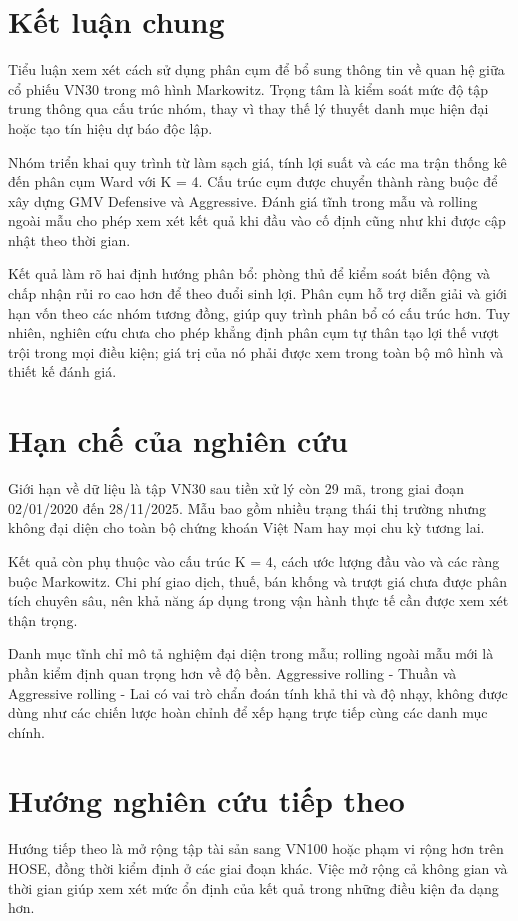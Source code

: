 \documentclass[12pt,a4paper,openany,oneside]{book}
\begin{document}
\section{Kết luận chung}\label{Toc227188454}
Tiểu luận xem xét cách sử dụng phân cụm để bổ sung thông tin về quan hệ giữa cổ phiếu VN30 trong mô hình Markowitz. Trọng tâm là kiểm soát mức độ tập trung thông qua cấu trúc nhóm, thay vì thay thế lý thuyết danh mục hiện đại hoặc tạo tín hiệu dự báo độc lập.

Nhóm triển khai quy trình từ làm sạch giá, tính lợi suất và các ma trận thống kê đến phân cụm Ward với K = 4. Cấu trúc cụm được chuyển thành ràng buộc để xây dựng GMV Defensive và Aggressive. Đánh giá tĩnh trong mẫu và rolling ngoài mẫu cho phép xem xét kết quả khi đầu vào cố định cũng như khi được cập nhật theo thời gian.

Kết quả làm rõ hai định hướng phân bổ: phòng thủ để kiểm soát biến động và chấp nhận rủi ro cao hơn để theo đuổi sinh lợi. Phân cụm hỗ trợ diễn giải và giới hạn vốn theo các nhóm tương đồng, giúp quy trình phân bổ có cấu trúc hơn. Tuy nhiên, nghiên cứu chưa cho phép khẳng định phân cụm tự thân tạo lợi thế vượt trội trong mọi điều kiện; giá trị của nó phải được xem trong toàn bộ mô hình và thiết kế đánh giá.

\section{Hạn chế của nghiên cứu}\label{Toc227188455}
Giới hạn về dữ liệu là tập VN30 sau tiền xử lý còn 29 mã, trong giai đoạn 02/01/2020 đến 28/11/2025. Mẫu bao gồm nhiều trạng thái thị trường nhưng không đại diện cho toàn bộ chứng khoán Việt Nam hay mọi chu kỳ tương lai.

Kết quả còn phụ thuộc vào cấu trúc K = 4, cách ước lượng đầu vào và các ràng buộc Markowitz. Chi phí giao dịch, thuế, bán khống và trượt giá chưa được phân tích chuyên sâu, nên khả năng áp dụng trong vận hành thực tế cần được xem xét thận trọng.

Danh mục tĩnh chỉ mô tả nghiệm đại diện trong mẫu; rolling ngoài mẫu mới là phần kiểm định quan trọng hơn về độ bền. Aggressive rolling - Thuần và Aggressive rolling - Lai có vai trò chẩn đoán tính khả thi và độ nhạy, không được dùng như các chiến lược hoàn chỉnh để xếp hạng trực tiếp cùng các danh mục chính.

\section{Hướng nghiên cứu tiếp theo}\label{Toc227188456}
Hướng tiếp theo là mở rộng tập tài sản sang VN100 hoặc phạm vi rộng hơn trên HOSE, đồng thời kiểm định ở các giai đoạn khác. Việc mở rộng cả không gian và thời gian giúp xem xét mức ổn định của kết quả trong những điều kiện đa dạng hơn.
\end{document}
